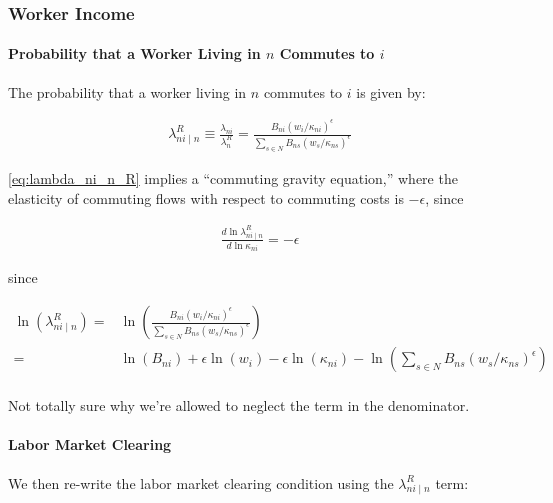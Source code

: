 \documentclass[10pt]{article}
\begin{document}
\subsubsection{Worker Income}

\paragraph{Probability that a Worker Living in $n$ Commutes to $i$}

The probability that a worker living in $n$ commutes to $i$ is given by:

\begin{align}
    \lambda_{n i \mid n}^R \equiv \frac{\lambda_{n i}}{\lambda_n^R}=\frac{B_{n i}\left(w_i / \kappa_{n i}\right)^\epsilon}{\sum_{s \in N} B_{n s}\left(w_s / \kappa_{n s}\right)^\epsilon} \label{eq:lambda_ni_n_R}
\end{align}

\eqref{eq:lambda_ni_n_R} implies a 
``commuting gravity equation,''
where the elasticity of commuting flows
with respect to commuting costs 
is $-\epsilon$, since

\begin{align}
    \frac{d \ln \lambda_{n i \mid n}^R}{d \ln \kappa_{n i}}=-\epsilon
\end{align}

since 

\begin{align}
    \ln \left(\lambda_{n i \mid n}^R\right) = &\ln \left(\frac{B_{n i}\left(w_i / \kappa_{n i}\right)^\epsilon}{\sum_{s \in N} B_{n s}\left(w_s / \kappa_{n s}\right)^\epsilon}\right) \\
    = &\ln(B_{ni}) + \epsilon \ln(w_i) - \epsilon \ln(\kappa_{ni}) - \ln\left(\sum_{s \in N} B_{n s}\left(w_s / \kappa_{n s}\right)^\epsilon\right) \\
\end{align}

\begin{questions}
    Not totally sure why we're allowed to neglect the term in the denominator.
\end{questions}

\paragraph{Labor Market Clearing}

We then re-write the labor market clearing condition
using the $\lambda_{n i \mid n}^R$ term:
\end{document}
